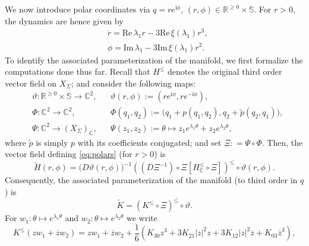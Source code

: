\documentclass[a4paper, 12pt, oneside, reqno, notitlepage]{amsart}
\theoremstyle{plain}
\theoremstyle{definition}
\theoremstyle{remark}
\begin{document}
We now introduce polar coordinates via $q = re^{\mathrm{i} \phi}$, $(r,\phi) \in \mathbb{R}^{\geq 0} \times \mathbb{S}$.
For $r >0$, the dynamics are hence given by
\begin{subequations}\label{eq:polars}
    \begin{align}
        & \dot{r} = \mathrm{Re} \, \lambda_1  r - 3 \mathrm{Re} \, \xi(\lambda_1) r^3,\\
        & \dot{\phi} = \mathrm{Im} \, \lambda_1 - 3 \mathrm{Im} \, \xi(\lambda_1) r^2. \label{eq:polars2}
    \end{align} 
\end{subequations}
To identify the associated parameterization of the manifold, we first formalize the computations done thus far. 
Recall that $H^\leq$ denotes the original third order vector field on $X_\Sigma$; and consider the following maps:
\begin{align*}
    &\vartheta: \mathbb{R}^{\geq 0} \times \mathbb{S} \to \mathbb{C}^2,  & &\vartheta(r,\phi) := (re^{\mathrm{i} \phi},re^{-\mathrm{i} \phi}), \\
    &\Phi: \mathbb{C}^2 \to \mathbb{C}^2, & &\Phi(q_1,q_2) := \big(q_1+p(q_1,q_2),q_2+\tilde{p}(q_2,q_1)\big), \\
    & \Psi: \mathbb{C}^2 \to (X_\Sigma)_\mathbb{C}, & &\Psi(z_1,z_2) :=\theta \mapsto z_1e^{\lambda_1 \theta} +z_2e^{\lambda_2 \theta},
\end{align*}
where $\tilde{p}$ is simply $p$ with its coefficients conjugated; and set $\Xi : = \Psi \circ \Phi$.
Then, the vector field defining \eqref{eq:polars} (for $r > 0$) is 
\begin{displaymath}
   \widetilde{H} (r,\phi) = \big(D\vartheta(r,\phi) \big)^{-1} \left( (D\Xi^{-1}) \circ \Xi [ H^\leq_\mathbb{C} \circ \Xi] \right)^{\leq} \circ \vartheta (r,\phi).
\end{displaymath}
Consequently, the associated parameterization of the manifold (to third order in $q$) is 
\begin{equation}
    \widetilde{K} = \left( K^\leq \circ \Xi \right)^\leq \circ \vartheta.
    \label{eq:widetildeK}
\end{equation}
For $w_1 : \theta \mapsto e^{\lambda_1 \theta}$ and $w_2 : \theta \mapsto e^{\lambda_2 \theta}$ 
we write 
\begin{displaymath}
    K^\leq(zw_1+\overline{z}w_2) = zw_1+\overline{z}w_2 + \frac16 \left(K_{30}z^3 + 3K_{21} |z|^2z + 3K_{12} |z|^2 \overline{z} + K_{03}\overline{z}^3  \right),
\end{displaymath}
\end{document}
